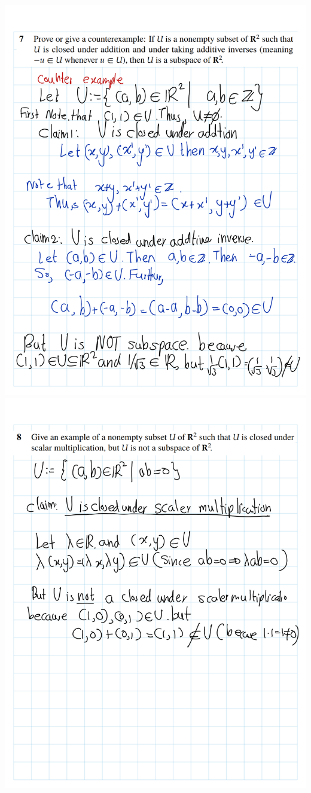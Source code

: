 \documentclass[
]{book}
\theoremstyle{definition}
\theoremstyle{definition}
\theoremstyle{definition}
\theoremstyle{definition}
\theoremstyle{remark}
\begin{document}
\begin{enumerate}
  \includegraphics{fig/Ex1C/Ex/Ex-04.png} \includegraphics{fig/Ex1C/Ex/Ex-05.png}

\end{enumerate}
\end{document}
